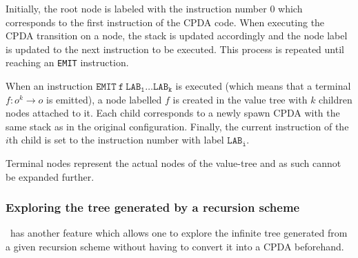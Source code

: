 Initially, the root node is labeled with the instruction number $0$ which corresponds to the first instruction of the CPDA code. When executing the CPDA transition on a node, the stack is updated accordingly and the node label is updated to the next instruction to be executed. This process is repeated until reaching an {\tt EMIT} instruction.

When an instruction $\mathtt{EMIT\ f\ LAB_1 \ldots LAB_k}$ is executed (which means that a terminal $f:o^k\rightarrow o$ is emitted), a node labelled $f$ is created in the value tree with $k$ children nodes attached to it. Each child corresponds to a newly spawn CPDA with the same stack as in the original configuration. Finally, the current instruction of the  $i$th child is set to the instruction number with label $\mathtt{LAB_i}$.

Terminal nodes represent the actual nodes of the value-tree and as such cannot be expanded further.

\subsubsection{Exploring the tree generated by a recursion scheme}

\toolname\ has another feature which allows one to explore the infinite tree generated from a given recursion scheme without having to convert it into a CPDA beforehand.


    
    


